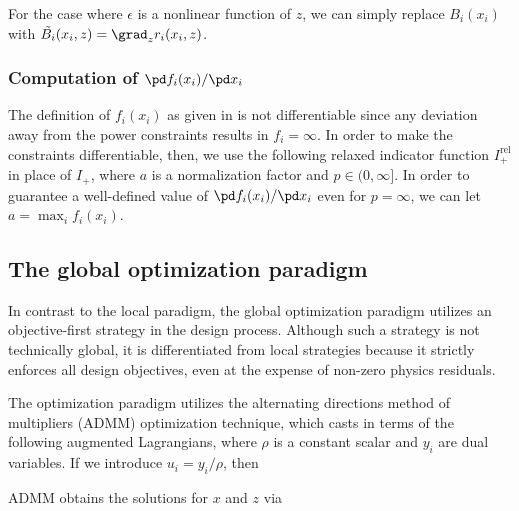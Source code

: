 \documentclass{book}
\begin{document}
For the case where $\epsilon$ is a nonlinear function of $z$,
    we can simply replace $B_i(x_i)$ with 
    $\tilde{B_i}(x_i, z) = \grad_z r_i(x_i, z)$.

\subsubsection{Computation of $\pd f_i(x_i) / \pd x_i$}
The definition of $f_i(x_i)$ as given in  is not differentiable 
    since any deviation away from the power constraints results in $f_i = \infty$.
In order to make the constraints differentiable, then, 
    we use the following relaxed indicator function $I^\text{rel}_+$ in place of $I_+$,
    where $a$ is a normalization factor and $p \in (0, \infty]$. 
In order to guarantee a well-defined value of $\pd f_i(x_i) / \pd x_i$ even for $p = \infty$,
    we can let $a = \max_i f_i(x_i)$.



\subsection{The global optimization paradigm}
In contrast to the local paradigm, 
    the global optimization paradigm utilizes an objective-first strategy
    in the design process.
Although such a strategy is not technically global,
    it is differentiated from local strategies because
    it strictly enforces all design objectives,
    even at the expense of non-zero physics residuals.

The optimization paradigm utilizes 
    the alternating directions method of multipliers\cite{ADMM} (ADMM) optimization technique, 
    which casts  in terms of the following augmented Lagrangians, 
    where $\rho$ is a constant scalar and 
    $y_i$ are dual variables. If we introduce $u_i = y_i / \rho$, then 

ADMM obtains the solutions for $x$ and $z$ via
\end{document}
